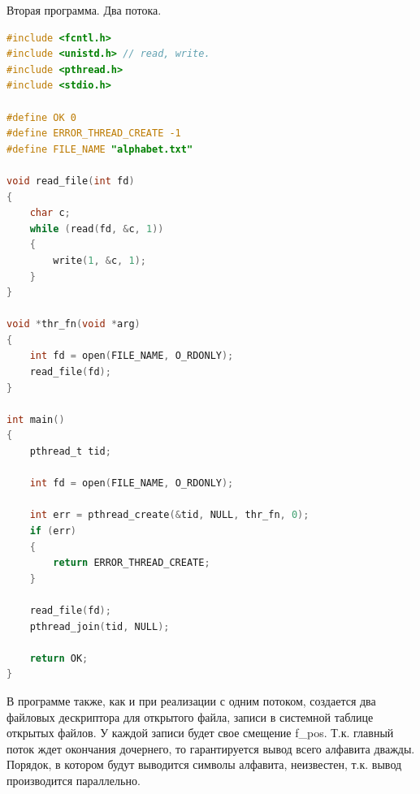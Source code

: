 \documentclass[a4paper,oneside,12pt]{extreport}
\begin{document}
\begin{task}
    Вторая программа. Два потока.
    \begin{lstlisting}[language=C]
#include <fcntl.h>
#include <unistd.h> // read, write.
#include <pthread.h>
#include <stdio.h>

#define OK 0
#define ERROR_THREAD_CREATE -1
#define FILE_NAME "alphabet.txt"

void read_file(int fd)
{
    char c;
    while (read(fd, &c, 1))
    {
        write(1, &c, 1);
    }
}

void *thr_fn(void *arg)
{
    int fd = open(FILE_NAME, O_RDONLY);
    read_file(fd);
}

int main()
{
    pthread_t tid;

    int fd = open(FILE_NAME, O_RDONLY);

    int err = pthread_create(&tid, NULL, thr_fn, 0);
    if (err)
    {
        return ERROR_THREAD_CREATE;
    }

    read_file(fd);
    pthread_join(tid, NULL);

    return OK;
}
    \end{lstlisting}

    В программе также, как и при реализации с одним потоком, создается
    два файловых дескриптора для открытого файла, записи в системной таблице открытых файлов.
    У каждой записи будет свое смещение f\_pos.
    Т.к. главный поток ждет окончания дочернего, то гарантируется вывод
    всего алфавита дважды.
    Порядок, в котором будут выводится символы алфавита, неизвестен,
    т.к. вывод производится параллельно.


    \begin{figure}[ht!]
    \end{figure}

\end{task}
\end{document}
